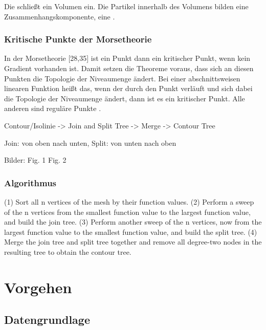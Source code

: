 Die  schließt ein Volumen ein. Die Partikel innerhalb des Volumens bilden eine Zusammenhangskomponente, eine .

\subsubsection{Kritische Punkte der Morsetheorie}

In der Morsetheorie \cite{chiang2005contourTreesUsingMonotonePaths}[28,35] ist ein Punkt dann ein kritischer Punkt, wenn kein Gradient vorhanden ist. Damit setzen die Theoreme voraus, dass sich an diesen Punkten die Topologie der Niveaumenge ändert. Bei einer abschnittsweisen linearen Funktion heißt das, wenn der  durch den Punkt verläuft und sich dabei die Topologie der Niveaumenge ändert, dann ist es ein kritischer Punkt. Alle anderen sind reguläre Punkte \cite{carr2010flexibleIsosurfaces} \cite{chiang2005contourTreesUsingMonotonePaths}.



Contour/Isolinie -> Join and Split Tree -> Merge -> Contour Tree \cite[S.~1]{carr2001computingCountourTrees}

Join: von oben nach unten, Split: von unten nach oben \cite{carr2001computingCountourTrees_web}

Bilder:
\cite[S.~1]{chiang2005contourTreesUsingMonotonePaths} Fig. 1
\cite[S.~44]{carr2010flexibleIsosurfaces} Fig. 2

\subsubsection{Algorithmus}
\cite{carr2001computingCountourTrees} \cite[S.~176]{chiang2005contourTreesUsingMonotonePaths}
(1) Sort all n vertices of the mesh by their function values.
(2) Perform a sweep of the n vertices from the smallest function value to the largest function value, and build the join tree.
(3) Perform another sweep of the n vertices, now from the largest function value to the smallest function value, and build the split tree.
(4) Merge the join tree and split tree together and remove all degree-two nodes in the resulting tree to obtain the contour tree.

\section{Vorgehen}

\subsection{Datengrundlage}

